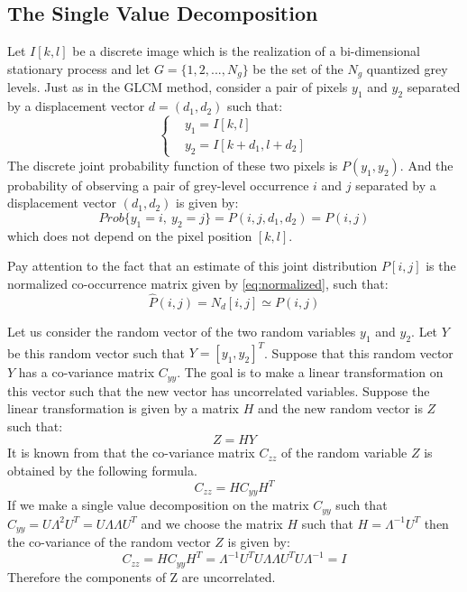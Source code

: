 \subsection{The Single Value Decomposition}
Let $I[k,l]$ be a discrete image which is the realization of a bi-dimensional stationary process and let $G=\{1, 2,...,N_g\}$ be the set of the $N_g$ quantized grey levels.
Just as in the GLCM method, consider a pair of pixels $y_1$ and $y_2$ separated by a displacement vector $d = (d_1, d_2)$ such that:
\begin{equation}
\begin{cases}
&y_1 = I[k,l]\\
&y_2 = I[k+d_1, l+d_2]
\end{cases}
\end{equation}
The discrete joint probability function of these two pixels is $P(y_1, y_2)$. And the probability of observing a pair of grey-level occurrence $i$ and $j$ separated by a displacement vector $(d_1, d_2)$ is given by:
\begin{equation}
    Prob\{y_1=i,\  y_2=j\} = P(i,j,d_1,d_2) = P(i,j)
\end{equation}
which does not depend on the pixel position $[k,l]$.

Pay attention to the fact that an estimate of this joint distribution $P[i,j]$ is the normalized co-occurrence matrix given by \ref{eq:normalized}, such that:
\begin{equation}
    \hat{P}(i,j) = N_d[i,j] \simeq P(i,j)
\end{equation}
\newline

Let us consider the random vector of the two random variables $y_1$ and $y_2$. Let $Y$ be this random vector such that $Y=[y_1, y_2]^T$. Suppose that this random vector $Y$ has a co-variance matrix $C_{yy}$. The goal is to make a linear transformation on this vector such that the new vector has uncorrelated variables. Suppose the linear transformation is given by a matrix $H$ and the new random vector is $Z$ such that:
\begin{equation}
    Z=HY
\end{equation}{}
It is known from \cite{papoulis} that the co-variance matrix $C_{zz}$ of the random variable $Z$ is obtained by the following formula.
\begin{equation}
    C_{zz} = HC_{yy}H^T
\end{equation}
If we make a single value decomposition on the matrix $C_{yy}$ such that $C_{yy} = U\Lambda^2U^T 
=U\Lambda \Lambda U^T$ and we choose the matrix $H$ such that $H = \Lambda^{-1}U^T$ then the co-variance of the random vector $Z$ is given by:
\begin{equation}
    C_{zz} = HC_{yy}H^T = \Lambda^{-1}U^T U\Lambda \Lambda U^T U \Lambda^{-1} = I
\end{equation}{}
Therefore the components of Z are uncorrelated.

